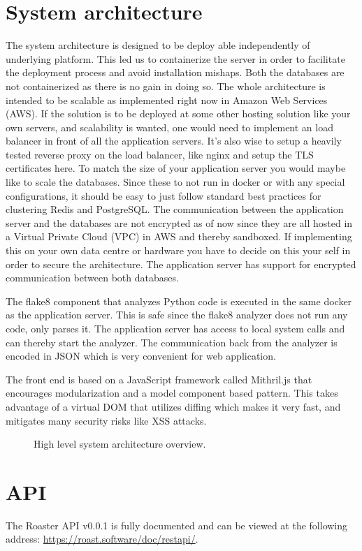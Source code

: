 \documentclass[12pt,a4paper]{report}
\begin{document}
\chapter{System architecture}
The system architecture is designed to be deploy able independently of underlying platform. This led us to containerize the server in order to facilitate the deployment process and avoid installation mishaps. Both the databases are not containerized as there is no gain in doing so.
The whole architecture is intended to be scalable as implemented right now in Amazon Web Services (AWS). If the solution is to be deployed at some other hosting solution like your own servers, and scalability is wanted, one would need to implement an load balancer in front of all the application servers. It's also wise to setup a heavily tested reverse proxy on the load balancer, like nginx and setup the TLS certificates here. To match the size of your application server you would maybe like to scale the databases. Since these to not run in docker or with any special configurations, it should be easy to just follow standard best practices for clustering Redis and PostgreSQL.
The communication between the application server and the databases are not encrypted as of now since they are all hosted in a Virtual Private Cloud (VPC) in AWS and thereby sandboxed. If implementing this on your own data centre or hardware you have to decide on this your self in order to secure the architecture. The application server has support for encrypted communication between both databases. 

The flake8 component that analyzes Python code is executed in the same docker as the application server. This is safe since the flake8 analyzer does not run any code, only parses it.
The application server has access to local system calls and can thereby start the analyzer. The communication back from the analyzer is encoded in JSON which is very convenient for web application.

The front end is based on a JavaScript framework called Mithril.js that encourages modularization and a model component based pattern. This takes advantage of a virtual DOM that utilizes diffing which makes it very fast, and mitigates many security risks like XSS attacks. 

\begin{figure}[H]
  \centering
  
  \caption{High level system architecture overview.}
\end{figure}
\chapter{API}
The Roaster API v0.0.1 is fully documented and can be viewed at the following address: \url{https://roast.software/doc/restapi/}.
\end{document}
